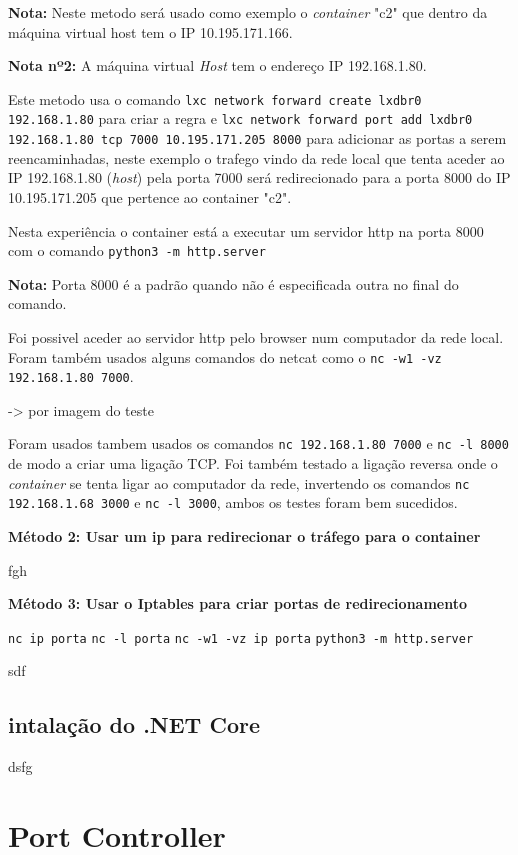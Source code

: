 \textbf{Nota:} Neste metodo será usado como exemplo o \textit{container} "c2" que
dentro da máquina virtual host tem o IP 10.195.171.166.

\textbf{Nota nº2:} A máquina virtual \textit{Host} tem o endereço IP 192.168.1.80.

Este metodo usa o comando \texttt{lxc network forward create lxdbr0 192.168.1.80}
para criar a regra e \texttt{lxc network forward port add lxdbr0 192.168.1.80 tcp 7000 10.195.171.205 8000}
para adicionar as portas a serem reencaminhadas, neste exemplo o trafego vindo da
rede local que tenta aceder ao IP 192.168.1.80 (\textit{host}) pela porta 7000 será redirecionado
para a porta 8000 do IP 10.195.171.205 que pertence ao container "c2".

Nesta experiência o container está a executar um servidor http na porta 8000
com o comando \texttt{python3 -m http.server}


\textbf{Nota:} Porta 8000 é a padrão quando não é especificada outra no final do comando.


Foi possivel aceder ao servidor http pelo browser num computador da rede local.
Foram também usados alguns comandos do netcat como o \texttt{nc -w1 -vz 192.168.1.80 7000}.

-> por imagem do teste

Foram usados tambem usados os comandos \texttt{nc 192.168.1.80 7000} e \texttt{nc -l 8000}
de modo a criar uma ligação TCP. Foi também testado a ligação reversa
onde o \textit{container} se tenta ligar ao computador da rede, invertendo os comandos
\texttt{nc 192.168.1.68 3000} e \texttt{nc -l 3000}, ambos os testes foram bem
sucedidos.

\textbf{Método 2: Usar um ip para redirecionar o tráfego para o container}

fgh

\textbf{Método 3: Usar o Iptables para criar portas de redirecionamento}




\texttt{nc ip porta}
\texttt{nc -l porta}
\texttt{nc -w1 -vz ip porta}
\texttt{python3 -m http.server}


sdf


\subsection{intalação do .NET Core}

dsfg

\section{Port Controller}


